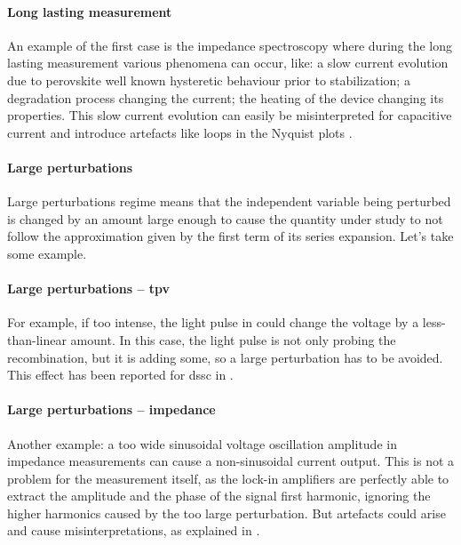 		\paragraph{Long lasting measurement} An example of the first case is the impedance spectroscopy where during the long lasting measurement various phenomena can occur, like: a slow current evolution due to perovskite well known hysteretic behaviour prior to stabilization; a degradation process changing the current; the heating of the device changing its properties.
		This slow current evolution can easily be misinterpreted for capacitive current \cite{Jacobs2018} and introduce artefacts like loops in the Nyquist plots \cite{Moia2019}.

		\paragraph{Large perturbations} \label{perturbation}
		Large perturbations regime means that the independent variable being perturbed is changed by an amount large enough to cause the quantity under study to not follow the approximation given by the first term of its series expansion.
		Let's take some example.

		\paragraph{Large perturbations -- \gls{tpv}}
		For example, if too intense, the light pulse in  could change the voltage by a less-than-linear amount.
		In this case, the light pulse is not only probing the recombination, but it is adding some, so a large perturbation has to be avoided.
		This effect has been reported for \gls{dssc} in .

		\paragraph{Large perturbations -- impedance}
		Another example: a too wide sinusoidal voltage oscillation amplitude in impedance measurements can cause a non-sinusoidal current output.
		This is not a problem for the measurement itself, as the lock-in amplifiers are perfectly able to extract the amplitude and the phase of the signal first harmonic, ignoring the higher harmonics caused by the too large perturbation.
		But artefacts could arise and cause misinterpretations, as explained in .

